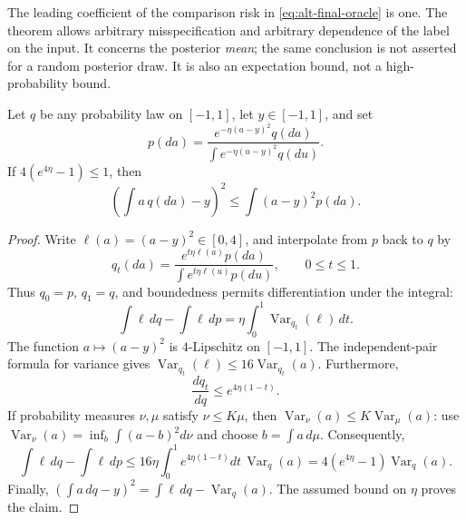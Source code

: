 The leading coefficient of the comparison risk in
\eqref{eq:alt-final-oracle} is one.  The theorem allows arbitrary
misspecification and arbitrary dependence of the label on the input.
It concerns the posterior \emph{mean}; the same conclusion is not
asserted for a random posterior draw.  It is also an expectation bound,
not a high-probability bound.

\begin{lemma}
\label{lem:alt-delete-one}
Let $q$ be any probability law on $[-1,1]$, let $y\in[-1,1]$, and set
\[
 p(da)=\frac{e^{-\eta(a-y)^2}q(da)}
                   {\int e^{-\eta(u-y)^2}q(du)}.
\]
If $4(e^{4\eta}-1)\le1$, then
\begin{equation}
 \left(\int a\,q(da)-y\right)^2
       \le\int(a-y)^2p(da).
 \label{eq:alt-delete-one}
\end{equation}
\end{lemma}

\begin{proof}
Write $\ell(a)=(a-y)^2\in[0,4]$, and interpolate from $p$ back to $q$ by
\[
 q_t(da)=\frac{e^{t\eta\ell(a)}p(da)}
                    {\int e^{t\eta\ell(u)}p(du)},
 \qquad 0\le t\le1.
\]
Thus $q_0=p$, $q_1=q$, and boundedness permits differentiation under the
integral:
\[
 \int\ell\,dq-\int\ell\,dp
       =\eta\int_0^1\operatorname{Var}_{q_t}(\ell)\,dt.
\]
The function $a\mapsto(a-y)^2$ is $4$-Lipschitz on $[-1,1]$.
The independent-pair formula for variance gives
$\operatorname{Var}_{q_t}(\ell)\le16\operatorname{Var}_{q_t}(a)$.
Furthermore,
\[
 \frac{dq_t}{dq}\le e^{4\eta(1-t)}.
\]
If probability measures $\nu,\mu$ satisfy $\nu\le K\mu$, then
$\operatorname{Var}_\nu(a)\le K\operatorname{Var}_\mu(a)$: use
$\operatorname{Var}_\nu(a)=\inf_b\int(a-b)^2d\nu$ and choose
$b=\int a\,d\mu$.  Consequently,
\[
 \int\ell\,dq-\int\ell\,dp
 \le16\eta\int_0^1e^{4\eta(1-t)}dt\,
                   \operatorname{Var}_{q}(a)
 =4(e^{4\eta}-1)\operatorname{Var}_{q}(a).
\]
Finally,
$(\int a\,dq-y)^2=\int\ell\,dq-\operatorname{Var}_q(a)$.
The assumed bound on $\eta$ proves the claim.
\end{proof}

